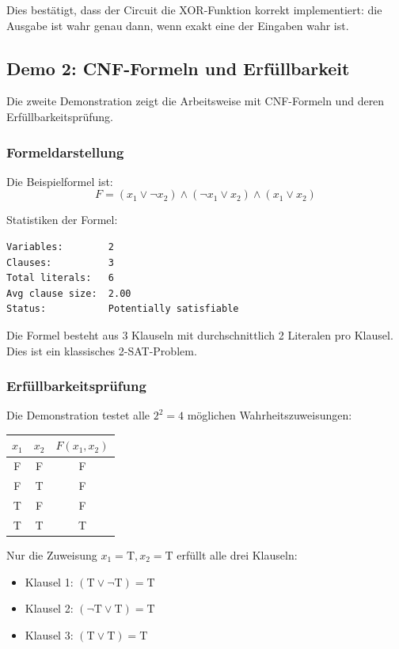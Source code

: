 ﻿\documentclass[a4paper,12pt]{article}
\theoremstyle{definition}
\begin{document}
Dies bestätigt, dass der Circuit die XOR-Funktion korrekt implementiert: die Ausgabe ist wahr genau dann, wenn exakt eine der Eingaben wahr ist.

\subsection{Demo 2: CNF-Formeln und Erfüllbarkeit}

Die zweite Demonstration zeigt die Arbeitsweise mit CNF-Formeln und deren Erfüllbarkeits\-prüfung.

\subsubsection{Formeldarstellung}

Die Beispielformel ist:
\[
F = (x_1 \lor \neg x_2) \land (\neg x_1 \lor x_2) \land (x_1 \lor x_2)
\]

Statistiken der Formel:
\begin{lstlisting}
Variables:        2
Clauses:          3
Total literals:   6
Avg clause size:  2.00
Status:           Potentially satisfiable
\end{lstlisting}

Die Formel besteht aus 3 Klauseln mit durchschnittlich 2 Literalen pro Klausel. Dies ist ein klassisches 2-SAT-Problem.

\subsubsection{Erfüllbarkeitsprüfung}

Die Demonstration testet alle $2^2 = 4$ möglichen Wahrheitszuweisungen:

\begin{center}
\begin{tabular}{cc|c}
$x_1$ & $x_2$ & $F(x_1, x_2)$ \\
\hline
F & F & F \\
F & T & F \\
T & F & F \\
T & T & T
\end{tabular}
\end{center}

Nur die Zuweisung $x_1 = \text{T}, x_2 = \text{T}$ erfüllt alle drei Klauseln:
\begin{itemize}
    \item Klausel 1: $(\text{T} \lor \neg \text{T}) = \text{T}$ \checkmark
    \item Klausel 2: $(\neg \text{T} \lor \text{T}) = \text{T}$ \checkmark
    \item Klausel 3: $(\text{T} \lor \text{T}) = \text{T}$ \checkmark
\end{itemize}
\end{document}
